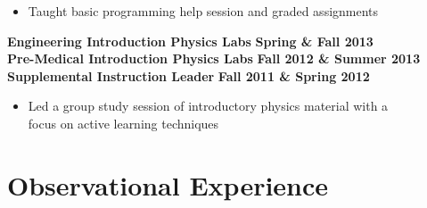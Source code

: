 \documentclass[margin]{res}
\begin{document}
\begin{resume}
    \begin{itemize}\itemsep -2pt
    \item[] Taught basic programming help session and graded assignments
    \end{itemize} \vspace{-12pt}
\textbf{Engineering Introduction Physics Labs} \hfill{} \textbf{Spring \& Fall 2013}\\
\textbf{Pre-Medical Introduction Physics Labs} \hfill{} \textbf{Fall 2012 \& Summer 2013}\\
{\bf Supplemental Instruction Leader} \hfill{} \textbf{Fall 2011 \& Spring 2012}
    \begin{itemize}\itemsep -2pt
    \item[] Led a group study session of introductory physics material with a \\focus on active learning techniques
    \end{itemize}

\begin{comment}
year |   Fall        | Spring        | Summer
1st  | Labs-premed   | labs-eng      | labs-premed
2nd  | Labs-eng      | RA            | RA
3rd  | RA/IntroAstro | Peter's intro | RA
4th  | IntroAstro    | Python        | RA
5th  | Physics C HW  | RA            | RA & REU classes
6th  | Fellowship (GRE Class) | Python | NA!?!
\end{comment}








\section{Observational Experience}


\end{resume}
\end{document}
